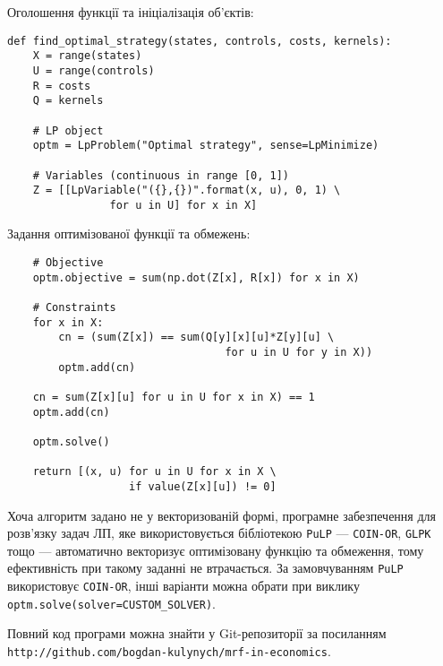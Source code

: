 \documentclass[oneside,14pt]{extarticle}
\begin{document}
Оголошення функції та ініціалізація об’єктів:
\begin{lstlisting}
def find_optimal_strategy(states, controls, costs, kernels):
    X = range(states)
    U = range(controls)
    R = costs
    Q = kernels
	
    # LP object
    optm = LpProblem("Optimal strategy", sense=LpMinimize)

    # Variables (continuous in range [0, 1])
    Z = [[LpVariable("({},{})".format(x, u), 0, 1) \
                for u in U] for x in X]
\end{lstlisting}

Задання оптимізованої функції та обмежень:
\begin{lstlisting}
    # Objective
    optm.objective = sum(np.dot(Z[x], R[x]) for x in X)

    # Constraints
    for x in X:
        cn = (sum(Z[x]) == sum(Q[y][x][u]*Z[y][u] \
                                  for u in U for y in X))
        optm.add(cn)
       
    cn = sum(Z[x][u] for u in U for x in X) == 1
    optm.add(cn)

    optm.solve()
	
    return [(x, u) for u in U for x in X \
                   if value(Z[x][u]) != 0]
\end{lstlisting}

Хоча алгоритм задано не у векторизованій формі, програмне забезпечення для розв’язку задач ЛП, яке використовується бібліотекою \texttt{PuLP} — \texttt{COIN-OR}, \texttt{GLPK} тощо — автоматично векторизує оптимізовану функцію та обмеження, тому ефективність при такому заданні не втрачається. За замовчуванням \texttt{PuLP} використовує \texttt{COIN-OR}\cite{COIN}, інші варіанти можна обрати при виклику \texttt{optm.solve(solver=CUSTOM\_SOLVER)}.

Повний код програми можна знайти у Git-репозиторії за посиланням \texttt{http://github.com/bogdan-kulynych/mrf-in-economics}.
\end{document}
